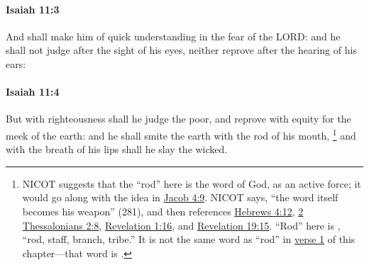 		\paragraph{Isaiah 11:3} %
			\label{ISAIAH-11-3}

			And shall make him of quick understanding in the fear of the LORD: and he shall not judge after the sight of his eyes, neither reprove after the hearing of his ears:


		\paragraph{Isaiah 11:4} %
			\label{ISAIAH-11-4}

			But with righteousness shall he judge the poor, and reprove with equity for the meek of the earth: and he shall smite the earth with the rod of his mouth,%
				\footnote{%
					NICOT suggests that the ``rod'' here is the word of God, as an active force; it would go along with the idea in \hyperref[JACOB-4-9]{Jacob 4:9}. NICOT says, ``the word itself becomes his weapon'' (281), and then references \hyperref[HEBREWS-4-12]{Hebrews 4:12}, \hyperref[2THESSALONIANS-2-8]{2 Thessalonians 2:8}, \hyperref[REVELATIONNT-1-16]{Revelation 1:16}, and \hyperref[REVELATIONNT-19-15]{Revelation 19:15}. ``Rod'' here is , ``rod, staff, branch, tribe.'' It is not the same word as ``rod'' in \hyperref[ISAIAH-11-1]{verse 1} of this chapter---that word is .
					}
			and with the breath of his lips shall he slay the wicked.

